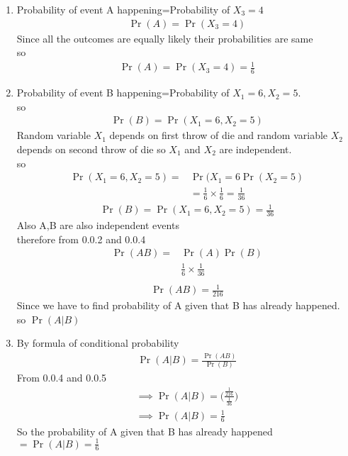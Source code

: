 \documentclass[journal,12pt,twocolumn]{IEEEtran}
\begin{document}
\begin{enumerate}
\item Probability of event A happening=Probability of $X_3=4$
\begin{align}
    \Pr{(A)}=\Pr{(X_3=4)}
\end{align}
Since all the outcomes are equally likely their probabilities are same \\
so
\begin{align}
    \Pr{(A)}=\Pr{(X_3=4)}=\frac{1}{6}
\end{align}
\item Probability of event B happening=Probability of $X_1=6,X_2=5$.\\
so
\begin{align}
    \Pr{(B)}=\Pr{(X_1=6,X_2=5)}
\end{align}
Random variable $X_1$ depends on first throw of die and random variable $X_2$ depends on second throw of die so $X_1$ and $X_2$ are independent.\\
so 
\begin{equation*}
\begin{split}
    \Pr{(X_1=6,X_2=5)}=&\Pr{(X_1=6} \Pr{(X_2=5)}\\
    &=\frac{1}{6}\times \frac{1}{6}=\frac{1}{36}
\end{split}
\end{equation*}
\begin{align}
    \Pr{(B)}=\Pr{(X_1=6,X_2=5)}=\frac{1}{36}
\end{align}
Also A,B are also independent events \\
therefore  from 0.0.2 and 0.0.4
\begin{equation*}
\begin{split}
    \Pr{(AB)}=&\Pr{(A)}  \Pr{(B)}\\
    &\frac{1}{6}\times \frac{1}{36}\\
    \end{split}
\end{equation*}
\begin{align}
    \Pr{(AB)}=\frac{1}{216}
\end{align}
Since we have to find probability of A given that B has already happened.\\
so $\Pr{(A|B)}$\\
\item By formula of conditional probability
\begin{align}
    \Pr{(A|B)}=\frac{\Pr{(AB)}}{\Pr{(B)}}
    \end{align}
    From 0.0.4 and 0.0.5 
    \begin{align}  
    \implies
    \Pr{(A|B)}=\Bigg(\frac{\frac{1}{216}}{\frac{1}{36}}\Bigg)\\
    \implies
    \Pr{(A|B)}=\frac{1}{6}
    \end{align}
    So the probability of A given that B has already happened $=\Pr{(A|B)}=\frac{1}{6}$
\end{enumerate}
\end{document}

